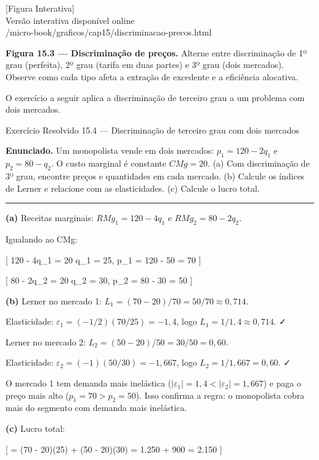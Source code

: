 \documentclass[11pt,twoside,openright]{book}
\newcommand{\figurePlaceholder}[1]{%
  \begin{center}
    \begin{tcolorbox}[
      width=0.85\textwidth,
      colback=graybg,
      colframe=gray,
      boxrule=0.5pt,
      arc=2pt,
      halign=center,
      valign=center,
      height=5cm
    ]
      \centering
      \vfill
      {\sffamily\color{gray}\large [Figura Interativa]}\\[6pt]
      {\sffamily\small\color{gray} Versão interativa disponível online}\\[4pt]
      {\ttfamily\tiny\color{gray} #1}
      \vfill
    \end{tcolorbox}
  \end{center}
}
\begin{document}
\figurePlaceholder{/micro-book/graficos/cap15/discriminacao-precos.html}

\textbf{Figura 15.3 --- Discriminação de preços.} Alterne entre
discriminação de 1º grau (perfeita), 2º grau (tarifa em duas partes) e
3º grau (dois mercados). Observe como cada tipo afeta a extração de
excedente e a eficiência alocativa.

O exercício a seguir aplica a discriminação de terceiro grau a um
problema com dois mercados.

\begin{exresolvidobox}{Exercício Resolvido 15.4 — Discriminação de terceiro grau com dois mercados}

\textbf{Enunciado.} Um monopolista vende em dois mercados:
\(p_1 = 120 - 2q_1\) e \(p_2 = 80 - q_2\). O custo marginal é constante
\(CMg = 20\). (a) Com discriminação de 3º grau, encontre preços e
quantidades em cada mercado. (b) Calcule os índices de Lerner e
relacione com as elasticidades. (c) Calcule o lucro total.

\begin{center}\rule{0.5\linewidth}{0.5pt}\end{center}

\textbf{(a)} Receitas marginais: \(RMg_1 = 120 - 4q_1\) e
\(RMg_2 = 80 - 2q_2\).

Igualando ao CMg:

{[} 120 - 4q\_1 = 20 \implies q\_1 = 25, \quad p\_1 = 120 - 50 = 70 {]}

{[} 80 - 2q\_2 = 20 \implies q\_2 = 30, \quad p\_2 = 80 - 30 = 50 {]}

\textbf{(b)} Lerner no mercado 1:
\(L_1 = (70-20)/70 = 50/70 \approx 0{,}714\).

Elasticidade: \(\varepsilon_1 = (-1/2)(70/25) = -1{,}4\), logo
\(L_1 = 1/1{,}4 \approx 0{,}714\). ✓

Lerner no mercado 2: \(L_2 = (50-20)/50 = 30/50 = 0{,}60\).

Elasticidade: \(\varepsilon_2 = (-1)(50/30) = -1{,}667\), logo
\(L_2 = 1/1{,}667 = 0{,}60\). ✓

O mercado 1 tem demanda mais inelástica
(\(|\varepsilon_1| = 1{,}4 < |\varepsilon_2| = 1{,}667\)) e paga o preço
mais alto (\(p_1 = 70 > p_2 = 50\)). Isso confirma a regra: o
monopolista cobra mais do segmento com demanda mais inelástica.

\textbf{(c)} Lucro total:

{[} \pi = (70 - 20)(25) + (50 - 20)(30) = 1.250 + 900 = 2.150 {]}

\end{exresolvidobox}
\end{document}
